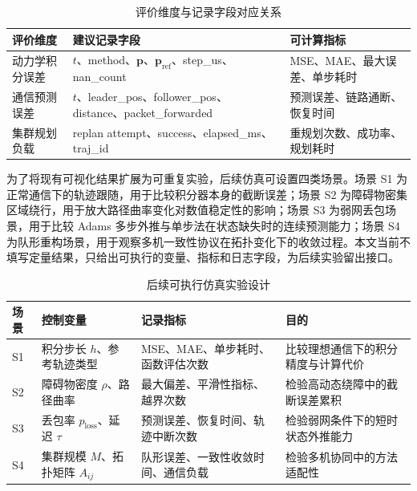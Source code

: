 \documentclass[UTF8,zihao=-4]{ctexart}
\begin{document}
\begin{table}[H]
  \centering
  \caption{评价维度与记录字段对应关系}
  \label{tab:metric-fields}
  \begin{tabularx}{\textwidth}{>{\centering\arraybackslash}p{3.0cm} X X}
    \toprule
    评价维度 & 建议记录字段 & 可计算指标 \\
    \midrule
    动力学积分误差 & $t$、method、$\bm p$、$\bm p_{\mathrm{ref}}$、step\_us、nan\_count & MSE、MAE、最大误差、单步耗时 \\
    通信预测误差 & $t$、leader\_pos、follower\_pos、distance、packet\_forwarded & 预测误差、链路通断、恢复时间 \\
    集群规划负载 & replan attempt、success、elapsed\_ms、traj\_id & 重规划次数、成功率、规划耗时 \\
    \bottomrule
  \end{tabularx}
\end{table}

为了将现有可视化结果扩展为可重复实验，后续仿真可设置四类场景。场景 S1 为正常通信下的轨迹跟随，用于比较积分器本身的截断误差；场景 S2 为障碍物密集区域绕行，用于放大路径曲率变化对数值稳定性的影响；场景 S3 为弱网丢包场景，用于比较 Adams 多步外推与单步法在状态缺失时的连续预测能力；场景 S4 为队形重构场景，用于观察多机一致性协议在拓扑变化下的收敛过程。本文当前不填写定量结果，只给出可执行的变量、指标和日志字段，为后续实验留出接口。

\begin{table}[H]
  \centering
  \caption{后续可执行仿真实验设计}
  \label{tab:experiment-design-template}
  \begin{tabularx}{\textwidth}{>{\centering\arraybackslash}p{1.5cm} p{3.2cm} X X}
    \toprule
    场景 & 控制变量 & 记录指标 & 目的 \\
    \midrule
    S1 & 积分步长 $h$、参考轨迹类型 & MSE、MAE、单步耗时、函数评估次数 & 比较理想通信下的积分精度与计算代价 \\
    S2 & 障碍物密度 $\rho$、路径曲率 & 最大偏差、平滑性指标、越界次数 & 检验高动态绕障中的截断误差累积 \\
    S3 & 丢包率 $p_{\mathrm{loss}}$、延迟 $\tau$ & 预测误差、恢复时间、轨迹中断次数 & 检验弱网条件下的短时状态外推能力 \\
    S4 & 集群规模 $M$、拓扑矩阵 $A_{ij}$ & 队形误差、一致性收敛时间、通信负载 & 检验多机协同中的方法适配性 \\
    \bottomrule
  \end{tabularx}
\end{table}
\end{document}
